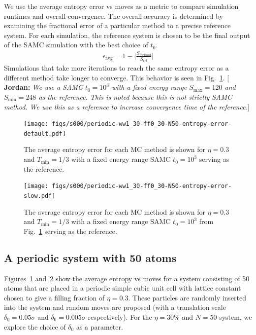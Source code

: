 \documentclass[letterpaper,twocolumn,amsmath,amssymb,pre,aps,10pt]{revtex4-1}
\newcommand{\blue}[1]{{\bf \color{blue} #1}}
\newcommand{\jpsays}[1]{{\color{red} [\blue{Jordan:} \emph{#1}]}}
\begin{document}
We use the average entropy error vs moves as a metric to compare
simulation runtimes and overall convergence. The overall accuracy
is determined by examining the fractional error of a particular method to
a precise reference system. For each simulation, the reference system
is chosen to be the final output of the SAMC simulation with the best
choice of $t_0$.
\begin{align}
\epsilon_\text{avg} = 1 - \bigg\lvert\frac{S_\text{method}}{S_\text{ref}}\bigg\rvert
\end{align}
Simulations that take more iterations to reach the same entropy error as a
different method take longer to converge. This behavior is seen in
Fig.~\ref{fig:N50-ff0.3-avg-error}.
\jpsays{We use a SAMC $t_0 = 10^3$ with a fixed energy range $S_{\max} = 120$ and $S_{\min} = 248$ as the reference.
This is noted because this is not strictly SAMC method. We use this as a reference to increase convergence time of the
reference.}
\begin{figure}
  \texttt{[image: figs/s000/periodic-ww1\_30-ff0\_30-N50-entropy-error-default.pdf]}
  \caption{The average entropy error for each MC method is shown for $\eta = 0.3$ and $T_{\min} = 1/3$ with
  a fixed energy range SAMC $t_0 = 10^3$ serving as the reference.}\label{fig:N50-ff0.3-avg-error}
\end{figure}
\begin{figure}
  \texttt{[image: figs/s000/periodic-ww1\_30-ff0\_30-N50-entropy-error-slow.pdf]}
  \caption{The average entropy error for each MC method is shown for $\eta = 0.3$ and $T_{\min} = 1/3$ with
  a fixed energy range SAMC $t_0 = 10^3$ from Fig.~\ref{fig:N50-ff0.3-avg-error}
  serving as the reference.}\label{fig:N50-ff0.3-avg-error-slow}
\end{figure}

\subsection{A periodic system with 50 atoms}

Figures~\ref{fig:N50-ff0.3-avg-error}
and~\ref{fig:N50-ff0.3-avg-error-slow} show the average entropy vs
moves for a system consisting of 50 atoms that are placed in a periodic
simple cubic unit cell with lattice constant chosen to give a filling
fraction of $\eta = 0.3$.  These particles are randomly inserted into
the system and random moves are proposed (with a translation scale
$\delta_0 = 0.05\sigma$ and $\delta_0 = 0.005\sigma$ respectively). For
the $\eta = 30\%$ and $N = 50$ system, we explore the choice of
$\delta_0$ as a parameter.
\end{document}
